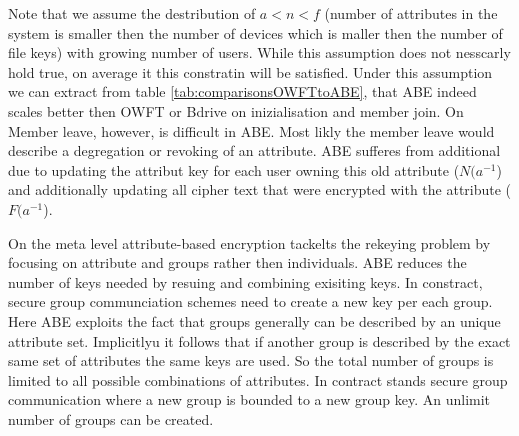 Note that we assume the destribution of $a < n < f$ (number of attributes in the system is smaller then the number of devices which is maller then the number of file keys) with growing number of users. While this assumption does not nesscarly hold true, on average it this constratin will be satisfied. Under this assumption we can extract from table \ref{tab:comparisonsOWFTtoABE}, that ABE indeed scales better then OWFT or Bdrive on inizialisation and member join. On Member leave, however, is difficult in ABE. Most likly the member leave would describe a degregation or revoking of an attribute. ABE sufferes from additional due to updating the attribut key for each user owning this old attribute ($N(a^{-1}$) and additionally updating all cipher text that were encrypted with the attribute ($F(a^{-1}$).

On the meta level attribute-based encryption tackelts the rekeying problem by focusing on attribute and groups rather then individuals. ABE reduces the number of keys needed by resuing and combining exisiting keys. In constract, secure group communciation schemes need to create a new key per each group. Here ABE exploits the fact that groups generally can be described by an unique attribute set. Implicitlyu it follows that if another group is described by the exact same set of attributes the same keys are used. So the total number of groups is limited to all possible combinations of attributes. In contract stands secure group communication where a new group is bounded to a new group key. An unlimit number of groups can be created.



